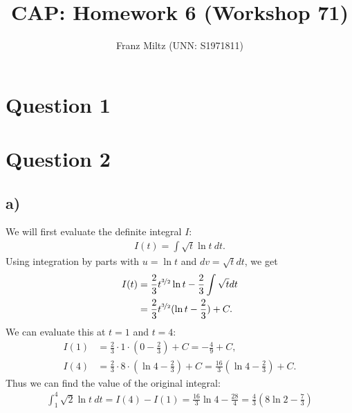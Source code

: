\documentclass{article}
\title{CAP: Homework 6 (Workshop 71)}
\author{Franz Miltz (UNN: S1971811)}
\begin{document}
\maketitle
\section*{Question 1}
\section*{Question 2}
\subsection*{a)}
We will first evaluate the definite integral $I$:
\begin{align*}
  I(t)=\int \sqrt{t}\ln t\: dt.
\end{align*}
Using integration by parts with $u=\ln t$ and $dv=\sqrt{t}dt$, we get
\begin{align*}
  I(t)&=\frac{2}{3}t^{\nicefrac{3}{2}}\ln t - \frac{2}{3}\int \sqrt{t}dt\\
  &=\frac{2}{3}t^{\nicefrac{3}{2}}(\ln t - \frac{2}{3}) + C.
\end{align*}
We can evaluate this at $t=1$ and $t=4$:
\begin{align*}
  I(1)&=\frac{2}{3}\cdot 1\cdot (0-\frac{2}{3})+C=-\frac{4}{9}+C,\\
  I(4)&=\frac{2}{3}\cdot 8\cdot(\ln 4 - \frac{2}{3})+C=\frac{16}{3}(\ln 4 - \frac{2}{3})+C.
\end{align*}
Thus we can find the value of the original integral:
\begin{align*}
  \int_1^4 \sqrt{2}\ln t\:dt = I(4)-I(1) =\frac{16}{3}\ln 4 - \frac{28}{4}= \frac{4}{3}(8\ln 2 - \frac{7}{3})
\end{align*}
\end{document}
